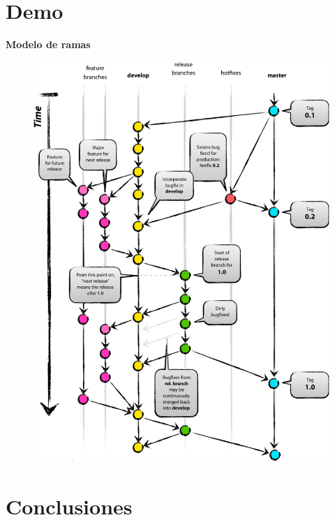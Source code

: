 \documentclass[11pt]{beamer}
\begin{document}
\section{Demo}

\begin{frame}{\textbf{\LARGE{Modelo de ramas}}}
	\vspace{-.7cm}
	\begin{figure}[H]
		{\includegraphics[height=.8\textheight]{./imagenes/Git-branching-model.pdf}}
	\end{figure}	
\end{frame}

\section{Conclusiones}
\end{document}
